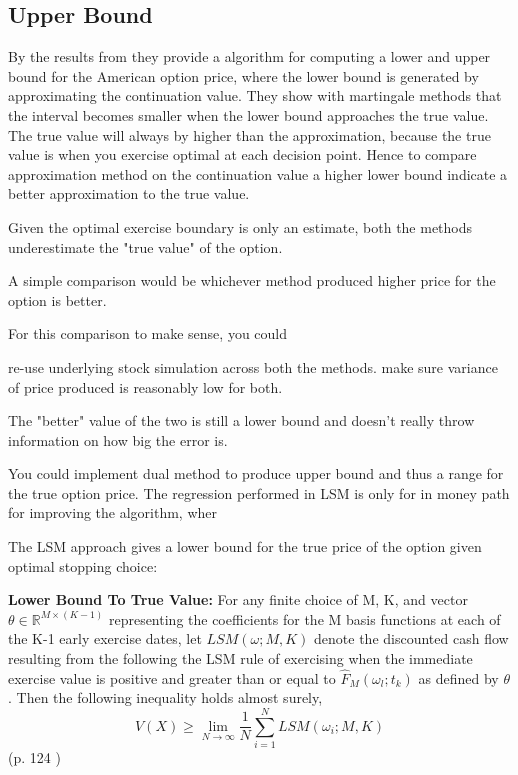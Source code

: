 \subsection{Upper Bound}
By the results from \parencite{AndersenLeif2004} they provide a algorithm for computing a lower and upper bound for the American option price, where the lower bound is generated by approximating the continuation value. They show with martingale methods that the interval becomes smaller when the lower bound approaches the true value. The true value will always by higher than the approximation, because the true value is when you exercise optimal at each decision point. Hence to compare approximation method on the continuation value a higher lower bound indicate a better approximation to the true value.

Given the optimal exercise boundary is only an estimate, both the methods underestimate the "true value" of the option.

A simple comparison would be whichever method produced higher price for the option is better.

For this comparison to make sense, you could

    re-use underlying stock simulation across both the methods.
    make sure variance of price produced is reasonably low for both.

The "better" value of the two is still a lower bound and doesn't really throw information on how big the error is.

You could implement dual method to produce upper bound and thus a range for the true option price.
The regression performed in LSM is only for in money path for improving the algorithm, wher



The LSM approach gives a lower bound for the true price of the option given optimal stopping choice:
\theoremstyle{proposition}
\begin{proposition}{}\label{Lower-Bound-LSM}
\textbf{Lower Bound To True Value:} For any finite choice of M, K, and vector $\theta\in \mathbb{R}^{M \times (K-1)}$ representing the coefficients for the M basis functions at each of the K-1 early exercise dates, let $LSM(\omega;M,K)$ denote the discounted cash flow resulting from the following the LSM rule of exercising when the immediate exercise value is positive and greater than or equal to $\hat{F}_{M}(\omega_{l};t_{k})$ as defined by $\theta$. Then the following inequality holds almost surely,
$$V(X)\geq \lim_{N\to \infty} \dfrac{1}{N}\sum_{i=1}^{N} LSM(\omega_i;M,K)$$
(p. 124 \parencite{LSM})
\end{proposition}


